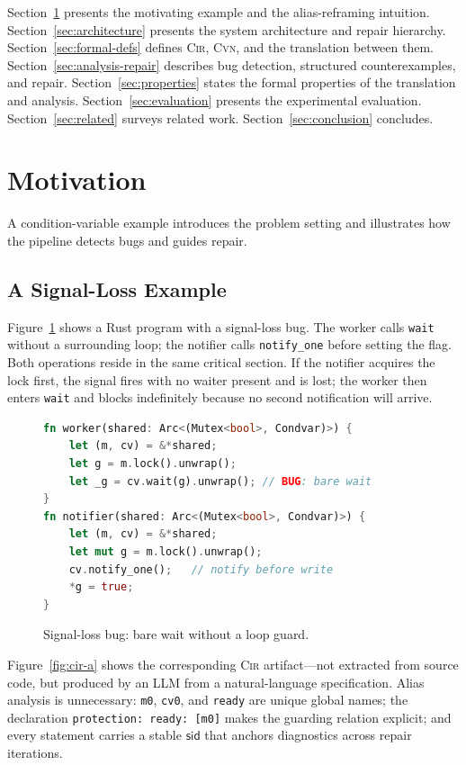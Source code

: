 \documentclass[sigconf]{acmart}
\begin{document}
Section~\ref{sec:motivation} presents the motivating example and the alias-reframing intuition.
Section~\ref{sec:architecture} presents the system architecture and repair hierarchy.
Section~\ref{sec:formal-defs} defines \textsc{Cir}, \textsc{Cvn}, and the translation between them.
Section~\ref{sec:analysis-repair} describes bug detection, structured counterexamples, and repair.
Section~\ref{sec:properties} states the formal properties of the translation and analysis.
Section~\ref{sec:evaluation} presents the experimental evaluation.
Section~\ref{sec:related} surveys related work.
Section~\ref{sec:conclusion} concludes.

\section{Motivation}
\label{sec:motivation}
A condition-variable example introduces the problem setting and illustrates how the pipeline detects bugs and guides repair.

\subsection{A Signal-Loss Example}
\label{subsec:running-example}

Figure~\ref{fig:example-a} shows a Rust program with a signal-loss bug. The worker calls \texttt{wait} without a surrounding loop; the notifier calls \texttt{notify\_one} before setting the flag. Both operations reside in the same critical section. If the notifier acquires the lock first, the signal fires with no waiter present and is lost; the worker then enters \texttt{wait} and blocks indefinitely because no second notification will arrive.

\begin{figure}[t]
\begin{lstlisting}[language=rust]
fn worker(shared: Arc<(Mutex<bool>, Condvar)>) {
    let (m, cv) = &*shared;
    let g = m.lock().unwrap();
    let _g = cv.wait(g).unwrap(); // BUG: bare wait
}
fn notifier(shared: Arc<(Mutex<bool>, Condvar)>) {
    let (m, cv) = &*shared;
    let mut g = m.lock().unwrap();
    cv.notify_one();   // notify before write
    *g = true;
}
\end{lstlisting}
\caption{Signal-loss bug: bare wait without a loop guard.}
\label{fig:example-a}
\end{figure}

Figure~\ref{fig:cir-a} shows the corresponding \textsc{Cir} artifact---not extracted from source code, but produced by an LLM from a natural-language specification. Alias analysis is unnecessary: \texttt{m0}, \texttt{cv0}, and \texttt{ready} are unique global names; the declaration \texttt{protection:\ ready:\ [m0]} makes the guarding relation explicit; and every statement carries a stable $\mathsf{sid}$ that anchors diagnostics across repair iterations.
\end{document}
